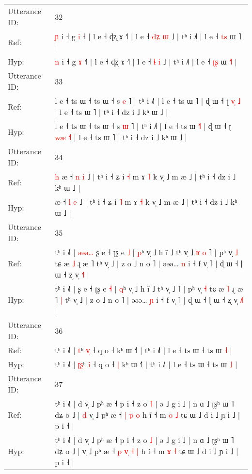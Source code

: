 \documentclass[10pt]{article}
\DeclareRobustCommand{\hl}[1]{{\textcolor{red}{#1}}}
\begin{document}
\begin{longtable}{ll}
 \\
\midrule
Utterance ID: & 32 \\
Ref: & \hl{ɲ} i ˧ g \hl{i} ˧\hl{} | l e ˧ ɖʐ ɤ ˧˥ | l e ˧ \hl{d}\hl{ʑ} \hl{ɯ} ˩ | tʰ i ˩˥ | l e ˧ \hl{t}\hl{s} ɯ \hl{}˥ |
 \\
Hyp: & \hl{n} i ˧ g \hl{ɤ} ˧\hl{˥} | l e ˧ ɖʐ ɤ ˧˥ | l e ˧ \hl{}\hl{ɬ} \hl{i} ˩ | tʰ i ˩˥ | l e ˧ \hl{ʈ}\hl{ʂ} ɯ \hl{˧}˥ |
 \\
\midrule
Utterance ID: & 33 \\
Ref: & l e ˧ ts ɯ ˧ ts ɯ ˧ s \hl{e} ˥ | tʰ i ˩˥ | l e ˧ ts ɯ \hl{}˥ | ɖ ɯ ˧ ʈ \hl{v}\hl{̩} \hl{}\hl{˩} | l e ˧ ts ɯ ˥ | tʰ i ˧ dz i ˩ kʰ ɯ ˩ |
 \\
Hyp: & l e ˧ ts ɯ ˧ ts ɯ ˧ s \hl{ɯ} ˥ | tʰ i ˩˥ | l e ˧ ts ɯ \hl{˧}˥ | ɖ ɯ ˧ ʈ \hl{w}\hl{æ} \hl{˧}\hl{˥} | l e ˧ ts ɯ ˥ | tʰ i ˧ dz i ˩ kʰ ɯ ˩ |
 \\
\midrule
Utterance ID: & 34 \\
Ref: & \hl{h}\hl{ }æ ˧ \hl{n} \hl{i} ˩ | tʰ i ˧ ʑ i \hl{˧} m ɤ \hl{˥} k v̩ ˩ m æ ˩ | tʰ i ˧ dz i ˩ kʰ ɯ ˩ |
 \\
Hyp: & \hl{}\hl{}æ ˧ \hl{l} \hl{e} ˩ | tʰ i ˧ ʑ i \hl{˥} m ɤ \hl{˧} k v̩ ˩ m æ ˩ | tʰ i ˧ dz i ˩ kʰ ɯ ˩ |
 \\
\midrule
Utterance ID: & 35 \\
Ref: & tʰ i ˩˥ |\hl{ }\hl{ə}\hl{ə}\hl{ə}\hl{…} ʂ e ˧ ʈʂ e \hl{˩} | \hl{p}ʰ v̩ ˩ h ĩ ˩ tʰ v̩ ˩\hl{ }\hl{ʁ}\hl{ }\hl{o} ˥ | pʰ v̩ \hl{˩} tɕ æ \hl{˩} ɻ æ ˥\hl{}\hl{} tʰ v̩ ˩ | z o ˩ n o ˥ | əəə… \hl{n} i ˧ f v̩ ˥ | ɖ ɯ ˧ ɭ ɯ ˧ ʐ v̩ \hl{˧}˥ |
 \\
Hyp: & tʰ i ˩˥ |\hl{}\hl{}\hl{}\hl{}\hl{} ʂ e ˧ ʈʂ e \hl{˧} | \hl{q}ʰ v̩ ˩ h ĩ ˩ tʰ v̩ ˩\hl{}\hl{}\hl{}\hl{} ˥ | pʰ v̩ \hl{˧} tɕ æ \hl{˥} ɻ æ ˥\hl{ }\hl{|} tʰ v̩ ˩ | z o ˩ n o ˥ | əəə… \hl{ɲ} i ˧ f v̩ ˥ | ɖ ɯ ˧ ɭ ɯ ˧ ʐ v̩ \hl{˩}˥ |
 \\
\midrule
Utterance ID: & 36 \\
Ref: & tʰ i ˩˥ | \hl{}\hl{t}ʰ \hl{v}\hl{̩} ˧ q o ˧\hl{}\hl{} kʰ ɯ ˧˥ | tʰ i ˩˥ | l e ˧ ts ɯ ˧ ts ɯ \hl{˧} |
 \\
Hyp: & tʰ i ˩˥ | \hl{ʈ}\hl{ʂ}ʰ \hl{}\hl{i} ˧ q o ˧\hl{ }\hl{|} kʰ ɯ ˧˥ | tʰ i ˩˥ | l e ˧ ts ɯ ˧ ts ɯ \hl{˩} |
 \\
\midrule
Utterance ID: & 37 \\
Ref: & tʰ i ˩˥ | d v̩ ˩ pʰ æ ˧ p i ˧ z o \hl{˥} | ə ˩ g i ˩ | n ɑ ˩ ʈʂʰ ɯ ˥ dʑ o ˩ |\hl{ }\hl{d} v̩ ˩ pʰ æ ˧\hl{}\hl{} \hl{}\hl{|} \hl{p} \hl{o} h ĩ ˧ m \hl{o} \hl{˩} tɕ ɯ ˩ d i ˩ ɲ i ˩ | p i ˧ |
 \\
Hyp: & tʰ i ˩˥ | d v̩ ˩ pʰ æ ˧ p i ˧ z o \hl{˩} | ə ˩ g i ˩ | n ɑ ˩ ʈʂʰ ɯ ˥ dʑ o ˩ |\hl{}\hl{} v̩ ˩ pʰ æ ˧\hl{ }\hl{p} \hl{v}\hl{̩} \hl{˧} \hl{|} h ĩ ˧ m \hl{ɤ} \hl{˧} tɕ ɯ ˩ d i ˩ ɲ i ˩ | p i ˧ |

\end{longtable}
\end{document}
